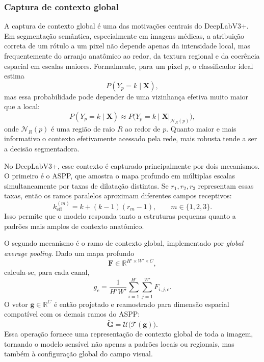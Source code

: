 \documentclass[tcc,capa]{texufpel}
\begin{document}
\subsubsection{Captura de contexto global}

A captura de contexto global é uma das motivações centrais do DeepLabV3+. Em segmentação semântica, especialmente em imagens médicas, a atribuição correta de um rótulo a um pixel não depende apenas da intensidade local, mas frequentemente do arranjo anatômico ao redor, da textura regional e da coerência espacial em escalas maiores. Formalmente, para um pixel \(p\), o classificador ideal estima
\begin{equation}
	P(Y_p = k \mid \mathbf{X}),
\end{equation}
mas essa probabilidade pode depender de uma vizinhança efetiva muito maior que a local:
\begin{equation}
	P(Y_p = k \mid \mathbf{X})
	\approx
	P\big(Y_p = k \mid \mathbf{X}\vert_{\mathcal{N}_R(p)}\big),
\end{equation}
onde \(\mathcal{N}_R(p)\) é uma região de raio \(R\) ao redor de \(p\). Quanto maior e mais informativo o contexto efetivamente acessado pela rede, mais robusta tende a ser a decisão segmentadora.

No DeepLabV3+, esse contexto é capturado principalmente por dois mecanismos. O primeiro é o ASPP, que amostra o mapa profundo em múltiplas escalas simultaneamente por taxas de dilatação distintas. Se \(r_1, r_2, r_3\) representam essas taxas, então os ramos paralelos aproximam diferentes campos receptivos:
\begin{equation}
	k_{\text{eff}}^{(m)} = k + (k-1)(r_m-1),
	\qquad m \in \{1,2,3\}.
\end{equation}
Isso permite que o modelo responda tanto a estruturas pequenas quanto a padrões mais amplos de contexto anatômico.

O segundo mecanismo é o ramo de contexto global, implementado por \textit{global average pooling}. Dado um mapa profundo
\begin{equation}
	\mathbf{F} \in \mathbb{R}^{H' \times W' \times C},
\end{equation}
calcula-se, para cada canal,
\begin{equation}
	g_c = \frac{1}{H'W'}\sum_{i=1}^{H'}\sum_{j=1}^{W'} F_{i,j,c}.
\end{equation}
O vetor \(\mathbf{g} \in \mathbb{R}^{C}\) é então projetado e reamostrado para dimensão espacial compatível com os demais ramos do ASPP:
\begin{equation}
	\tilde{\mathbf{G}} = \mathcal{U}\big(\mathcal{T}(\mathbf{g})\big).
\end{equation}
Essa operação fornece uma representação de contexto global de toda a imagem, tornando o modelo sensível não apenas a padrões locais ou regionais, mas também à configuração global do campo visual.
\end{document}
